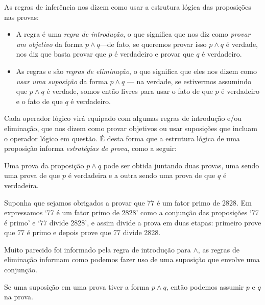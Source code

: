 As regras de inferência nos dizem como usar a estrutura lógica das proposições nas provas:

\begin{itemize}
\item A regra \introrule{\wedge} é uma \textit{regra de introdução}, o que significa que nos diz como \textit{provar um objetivo} da forma $p \wedge q$---de fato, se queremos provar isso $p \wedge q$ é verdade, \introrule{\wedge} nos diz que basta provar que $p$ é verdadeiro e provar que $q$ é verdadeiro.

\item As regras  e  são \textit{regras de eliminação}, o que significa que eles nos dizem como \textit{usar uma suposição} da forma $p \wedge q$ --- na verdade, se estivermos assumindo que $p \wedge q$ é verdade, somos então livres para usar o fato de que $p$ é verdadeiro e o fato de que $q$ é verdadeiro.
\end{itemize}

Cada operador lógico virá equipado com algumas regras de introdução e/ou eliminação, que nos dizem como provar objetivos ou usar suposições que incluam o operador lógico em questão. É desta forma que a estrutura lógica de uma proposição informa \textit{estratégias de prova}, como a seguir:

\begin{strategy}
\label{strProvingConjunctionsDirect}
Uma prova da proposição $p \wedge q$ pode ser obtida juntando duas provas, uma sendo uma prova de que $p$ é verdadeira e a outra sendo uma prova de que $q$ é verdadeira.
\end{strategy}

\begin{example}
\label{exSevenDividesTwentyEightConjunctionProof}
Suponha que sejamos obrigados a provar que 77 é um fator primo de 2828. Em  expressamos `77 é um fator primo de 2828' como a conjunção das proposições `77 é primo' e `77 divide 2828', e assim  divide a prova em duas etapas: primeiro prove que 77 é primo e depois prove que 77 divide 2828.
\end{example}

Muito parecido  foi informado pela regra de introdução para $\wedge$, as regras de eliminação informam como podemos fazer uso de uma suposição que envolve uma conjunção.
\begin{strategy}
\label{strAssumingConjunctionsDirect}
Se uma suposição em uma prova tiver a forma $p \wedge q$, então podemos assumir $p$ e $q$ na prova.
\end{strategy}

